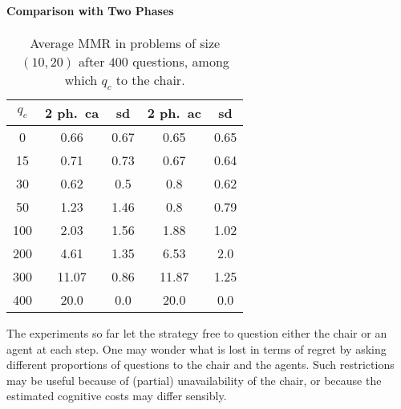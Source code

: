 \documentclass{article}
\begin{document}
\paragraph{Comparison with Two Phases}

\begin{table}
	\caption{Average MMR in problems of size $(10, 20)$ after $400$ questions, among which $q_c$ to the chair.}
	\label{tab:twoP400}
	\begin{tabular}{S[table-figures-integer=3, table-figures-decimal=0]S[table-number-alignment = right]@{ ± }S[table-number-alignment = left, table-figures-integer=1]S[table-number-alignment = right]@{ ± }S[table-number-alignment = left, table-figures-integer=1]}
		\toprule
		{$q_c$} & {2 ph.\ ca} & {sd} & {2 ph.\ ac} & {sd} \\
		 & 0.66 & 0.67 & 0.65 & 0.65  \\
		15 & 0.71 & 0.73 & 0.67	& 0.64 \\
		30 & 0.62 & 0.5 & 0.8 & 0.62 \\
		50 & 1.23 & 1.46 & 0.8 & 0.79 \\
		100 & 2.03 & 1.56 & 1.88 & 1.02  \\
		200 & 4.61	& 1.35  & 6.53 & 2.0  \\
		300 &11.07 & 0.86& 11.87 & 1.25 \\
		400 &20.0 & 0.0 & 20.0 & 0.0 \\
		\bottomrule
	\end{tabular}
\end{table}

The experiments so far let the strategy free to question either the chair or an agent at each step. One may wonder what is lost in terms of regret by asking different proportions of questions to the chair and the agents. Such restrictions may be useful because of (partial) unavailability of the chair, or because the estimated cognitive costs may differ sensibly. %
\end{document}
